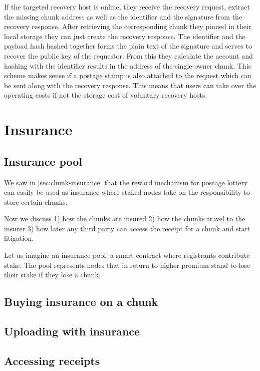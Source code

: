 If the targeted recovery host is online, they receive the recovery request, extract the missing chunk address as well as the identifier and the signature from the recovery response. After retrieving the corresponding chunk they pinned in their local storage they can just create the recovery response. The identifier and the payload hash hashed together forms the plain text of the signature and serves to recover the public key of the requestor. From this they calculate the account and hashing with the identifier results in the address of the single-owner chunk. This scheme makes sense if a postage stamp is also attached to the request which can be sent along with the recovery response. This means that users can take over the operating costs if not the storage cost of voluntary recovery hosts.



\section{Insurance \statusorange}\label{sec:insurance}
 

\subsection{Insurance pool \statusorange}
We saw in \ref{sec:chunk-insurance} that the reward mechanism for postage lottery can easily be used as insurance where staked nodes take on the responsibility to store certain chunks. 

Now we discuss  1) how the chunks are insured 2) how the chunks travel to the insurer 3) how later any third party can access the receipt for a chunk and start litigation.

Let us imagine an insurance pool, a smart contract where registrants contribute stake. The pool represents nodes that in return to higher premium stand to lose their stake if they lose a chunk. 

\subsection{Buying insurance on a chunk \statusred}

\subsection{Uploading with insurance \statusred}


\subsection{Accessing receipts \statusred}

